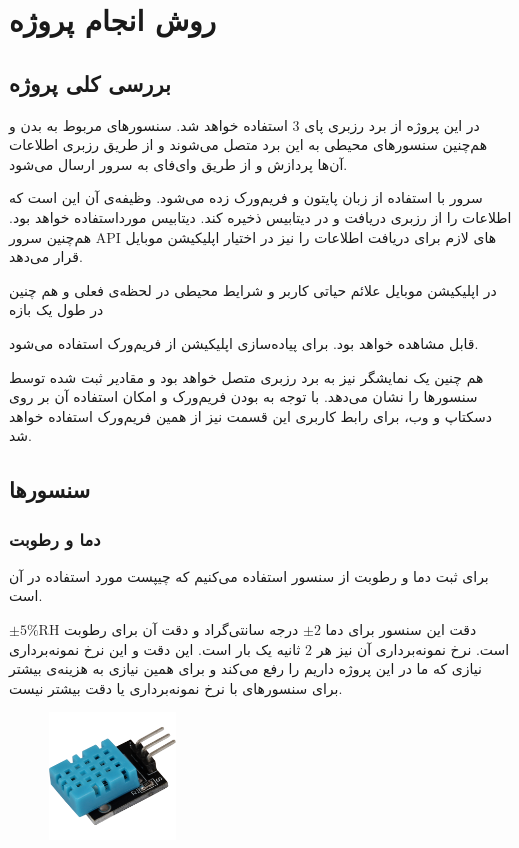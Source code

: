 \documentclass[12pt]{article}
\begin{document}
\newpage
\section{روش انجام پروژه}

\subsection{بررسی کلی پروژه}
در این پروژه از برد رزبری پای $3$ استفاده خواهد شد. سنسورهای مربوط به بدن و هم‌چنین سنسورهای محیطی به این برد متصل می‌شوند و از طریق رزبری اطلاعات آن‌ها پردازش و از طریق وای‌فای به سرور ارسال می‌شود. 

سرور با استفاده از زبان پایتون و فریم‌ورک  زده می‌شود. وظیفه‌ی آن این است که اطلاعات را از رزبری دریافت و در دیتابیس ذخیره کند. دیتابیس مورداستفاده  خواهد بود. هم‌چنین سرور API های لازم برای دریافت اطلاعات را نیز در اختیار اپلیکیشن موبایل قرار می‌دهد.

در اپلیکیشن موبایل علائم حیاتی کاربر و شرایط محیطی در لحظه‌ی فعلی و هم چنین در طول یک بازه 

قابل مشاهده خواهد بود. برای پیاده‌سازی اپلیکیشن از فریم‌ورک  استفاده می‌شود.

هم چنین یک نمایشگر نیز به برد رزبری متصل خواهد بود و مقادیر ثبت شده توسط سنسورها را نشان می‌دهد. با توجه به  بودن فریم‌ورک 
و امکان استفاده آن بر روی دسکتاپ و وب، برای رابط کاربری این قسمت نیز از همین فریم‌ورک استفاده خواهد شد.


\subsection{سنسورها}

\subsubsection{دما و رطوبت}
برای ثبت دما و رطوبت از سنسور  استفاده می‌کنیم که چیپست مورد استفاده در آن  است. 

دقت این سنسور برای دما $\pm2$ درجه سانتی‌گراد و دقت آن برای رطوبت $\pm 5\% \text{RH}$ است. نرخ نمونه‌برداری آن نیز هر $2$ ثانیه یک بار است. این دقت و این نرخ نمونه‌برداری نیازی که ما در این پروژه داریم را رفع می‌کند و برای همین نیازی به هزینه‌ی بیشتر برای سنسورهای با نرخ نمونه‌برداری یا دقت بیشتر نیست.

\begin{figure}[h]
	\begin{center}
		\includegraphics[width=0.3\textwidth]{KY-015}
	\end{center}
	\caption{}
\end{figure}
\end{document}
